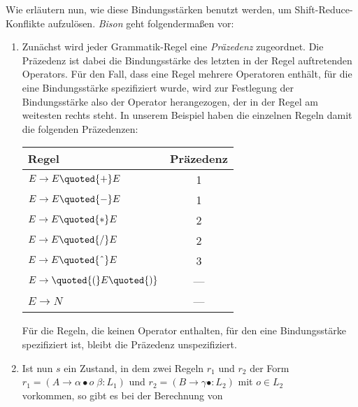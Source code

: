 Wie erl\"autern nun, wie diese Bindungsst\"arken benutzt werden, um Shift-Reduce-Konflikte aufzul\"osen.
\textsl{Bison} geht folgenderma{\ss}en vor:
\begin{enumerate}
\item Zun\"achst wird jeder Grammatik-Regel eine \emph{Pr\"azedenz} zugeordnet.
      Die Pr\"azedenz ist dabei die Bindungsst\"arke des letzten in der Regel auftretenden Operators.
      F\"ur den Fall, dass eine Regel mehrere Operatoren enth\"alt, f\"ur die eine Bindungsst\"arke spezifiziert
      wurde, wird zur Festlegung der Bindungsst\"arke also der Operator herangezogen, der in
      der Regel am weitesten 
      rechts steht.  In unserem Beispiel haben die einzelnen Regeln damit die folgenden Pr\"azedenzen:
      \begin{center}
        \begin{tabular}[t]{|l|c|}
          \hline
          Regel                          & Pr\"azedenz  \\
          \hline
          \hline
          $E \rightarrow E \quoted{+} E$ & 1          \\
          \hline
          $E \rightarrow E \quoted{-} E$ & 1          \\
          \hline
          $E \rightarrow E \quoted{*} E$ & 2          \\
          \hline
          $E \rightarrow E \quoted{/} E$ & 2          \\
          \hline
          $E \rightarrow E \quoted{\symbol{94}} E$ & 3 \\
          \hline
          $E \rightarrow \quoted{(} E \quoted{)}$ & --- \\
          \hline
          $E \rightarrow N$ & --- \\
          \hline
        \end{tabular}
      \end{center}
      F\"ur die Regeln, die keinen Operator enthalten, f\"ur den eine Bindungsst\"arke spezifiziert ist,
      bleibt die Pr\"azedenz unspezifiziert.
\item Ist nun $s$ ein Zustand, in dem zwei Regeln $r_1$ und $r_2$ der Form
      \\[0.2cm]
      \hspace*{1.3cm}
      $r_1 = (A \rightarrow \alpha \bullet o \;\beta:L_1)$ \quad und \quad
      $r_2 = (B \rightarrow \gamma \bullet : L_2)$ \quad mit \quad $o \in L_2$
      \\[0.2cm]
      vorkommen, so gibt es bei der Berechnung von 

\end{enumerate}
